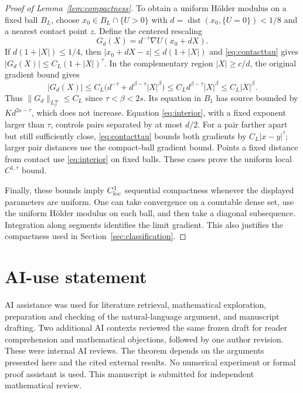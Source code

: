 \documentclass[11pt]{article}
\numberwithin{equation}{section}
\theoremstyle{remark}
\newcommand{\norm}[1]{\lVert #1\rVert}
\newcommand{\abs}[1]{\lvert #1\rvert}
\newcommand{\dist}{\operatorname{dist}}
\begin{document}
\begin{proof}[Proof of Lemma~\ref{lem:compactness}]
To obtain a uniform H\"older modulus on a fixed ball $B_L$, choose $x_0\in B_L\cap\{U>0\}$ with $d=\dist(x_0,\{U=0\})<1/8$ and a nearest contact point $z$. Define the centered rescaling
\[
 G_d(X)=d^{-\tau}\nabla U(x_0+dX).
\]
If $d(1+\abs X)\le1/4$, then $\abs{x_0+dX-z}\le d(1+\abs X)$ and \eqref{eq:contacttau} gives $\abs{G_d(X)}\le C_L(1+\abs X)^\tau$. In the complementary region $\abs X\ge c/d$, the original gradient bound gives
\[
 \abs{G_d(X)}\le C_L\bigl(d^{-\tau}+d^{\beta-\tau}\abs X^\beta\bigr)
 \le C_Ld^{\beta-\tau}\abs X^\beta\le C_L\abs X^\beta.
\]
Thus $\norm{G_d}_{L^\infty_\beta}\le C_L$ since $\tau<\beta<2s$. Its equation in $B_1$ has source bounded by $Kd^{2s-\tau}$, which does not increase. Equation \eqref{eq:interior}, with a fixed exponent larger than $\tau$, controls pairs separated by at most $d/2$. For a pair farther apart but still sufficiently close, \eqref{eq:contacttau} bounds both gradients by $C_L\abs{x-y}^{\tau}$; larger pair distances use the compact-ball gradient bound. Points a fixed distance from contact use \eqref{eq:interior} on fixed balls. These cases prove the uniform local $C^{1,\tau}$ bound.

Finally, these bounds imply $C^1_{\rm loc}$ sequential compactness whenever the displayed parameters are uniform. One can take convergence on a countable dense set, use the uniform H\"older modulus on each ball, and then take a diagonal subsequence. Integration along segments identifies the limit gradient. This also justifies the compactness used in Section~\ref{sec:classification}.
\end{proof}

\section*{AI-use statement}
AI assistance was used for literature retrieval, mathematical exploration, preparation and checking of the natural-language argument, and manuscript drafting. Two additional AI contexts reviewed the same frozen draft for reader comprehension and mathematical objections, followed by one author revision. These were internal AI reviews. The theorem depends on the arguments presented here and the cited external results. No numerical experiment or formal proof assistant is used. This manuscript is submitted for independent mathematical review.
\end{document}
